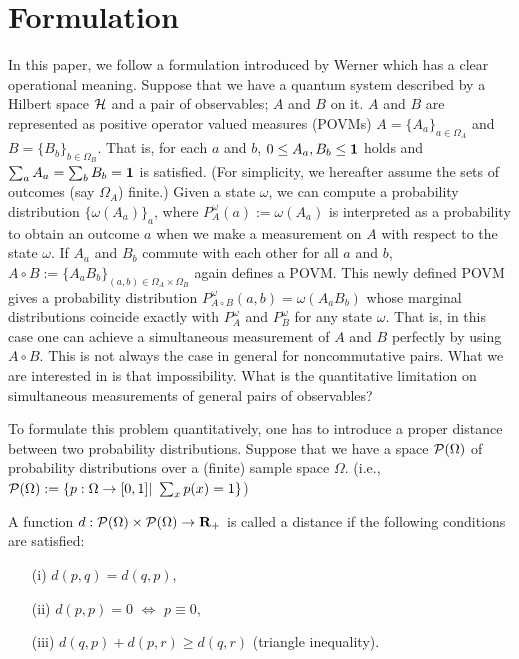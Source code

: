 \documentclass[12pt,showpacs,preprintnumbers,amsmath,amssymb]{revtex4-2}
\begin{document}
\section{Formulation}\label{sec:formulation}
In this paper, we follow a formulation introduced by Werner \cite{Werner}
which has a clear operational meaning. 
Suppose that we have a quantum system described by a Hilbert space 
${\cal H}$ and 
a pair of observables;
$A$ and $B$ on it. 
$A$ and $B$ are
represented as positive operator 
valued measures (POVMs) $A=\{A_a\}_{a \in \Omega_A}$ and 
$B=\{B_b\}_{b \in \Omega_B}$.
 That is,  
for each $a$ and $b$, $0\leq A_a, B_b\leq {\bf 1}$ holds and 
$\sum_a A_a =\sum_b B_b ={\bf 1}$ is satisfied. 
(For simplicity, we hereafter assume the sets of outcomes (say $\Omega_A$) 
finite.)
Given a state $\omega$, we can compute a probability distribution 
$\{\omega(A_a)\}_a$, where $P^{\omega}_{A}(a):=\omega(A_a)$
 is interpreted as a probability to 
obtain an outcome $a$ when we make a measurement on $A$ with 
respect to the state $\omega$. 
If $A_a$ and $B_b$ commute with each other for all $a$ and $b$, 
$A\circ B:=\{A_a B_b\}_{(a,b) \in \Omega_A \times \Omega_B}$ 
again defines a POVM. 
This newly defined POVM gives a probability distribution 
$P^{\omega}_{A\circ B}(a,b)=\omega(A_aB_b)$ whose marginal distributions 
coincide exactly with 
$P^{\omega}_{A}$ and $P^{\omega}_B$ for any state $\omega$. 
That is, in this case one can achieve a simultaneous measurement 
of $A$ and $B$ perfectly by using $A\circ B$. 
This is not always the case in general for noncommutative pairs. 
What we are interested in is that impossibility. 
What is the quantitative limitation on simultaneous measurements 
of general pairs of observables? 
\par
To formulate this problem quantitatively, one has to 
introduce a proper distance between two probability distributions. 
Suppose that we have a space ${\cal P}(\Omega)$ 
of probability distributions 
over a (finite) sample space $\Omega$. 
(i.e., ${\cal P}(\Omega):=\{p:\Omega \to [0,1]|\ \sum_x p(x)=1\}$)
\par
A function $d: {\cal P}(\Omega) \times {\cal P}(\Omega)
\to {\bf R}_{+}$ is called a distance if the following conditions are 
satisfied: 
\begin{itemize}
\item[(i)] $d(p,q)=d(q,p)$,
\item[(ii)]$d(p,p)=0$ $\Leftrightarrow$ $p\equiv 0$,
\item[(iii)] $d(q,p)+d(p,r)\geq d(q,r)$ (triangle inequality). 
\end{itemize}
\end{document}

